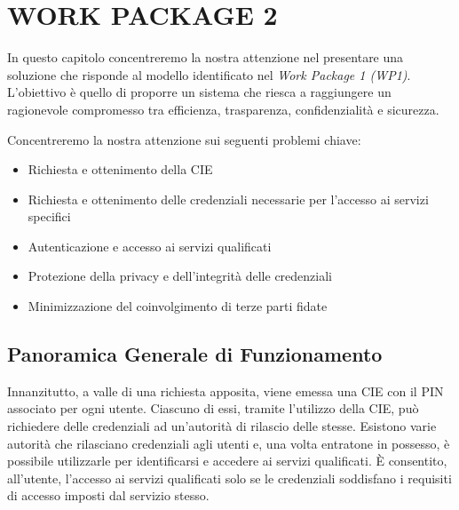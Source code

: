 \chapter{WORK PACKAGE 2}
In questo capitolo concentreremo la nostra attenzione nel presentare una soluzione che risponde al modello identificato nel \textit{Work Package 1 (WP1)}.
L’obiettivo è quello di proporre un sistema che riesca a raggiungere un ragionevole compromesso tra efficienza, trasparenza, confidenzialità e sicurezza.

\noindent Concentreremo la nostra attenzione sui seguenti problemi chiave:
    \begin{itemize}
        \item Richiesta e ottenimento della CIE
        
        \item Richiesta e ottenimento delle credenziali necessarie per l'accesso ai servizi specifici
        
        \item Autenticazione e accesso ai servizi qualificati
    
        \item Protezione della privacy e dell'integrità delle credenziali
    
        \item Minimizzazione del coinvolgimento di terze parti fidate
    \end{itemize}


    \section{Panoramica Generale di Funzionamento}
        Innanzitutto, a valle di una richiesta apposita, viene emessa una CIE con il PIN associato per ogni utente.
        Ciascuno di essi, tramite l'utilizzo della CIE, può richiedere delle credenziali ad un'autorità di rilascio delle stesse.
        Esistono varie autorità che rilasciano credenziali agli utenti e, una volta entratone in possesso, è possibile utilizzarle per identificarsi e accedere ai servizi qualificati.
        È consentito, all’utente, l'accesso ai servizi qualificati solo se le credenziali soddisfano i requisiti di accesso imposti dal servizio stesso.


